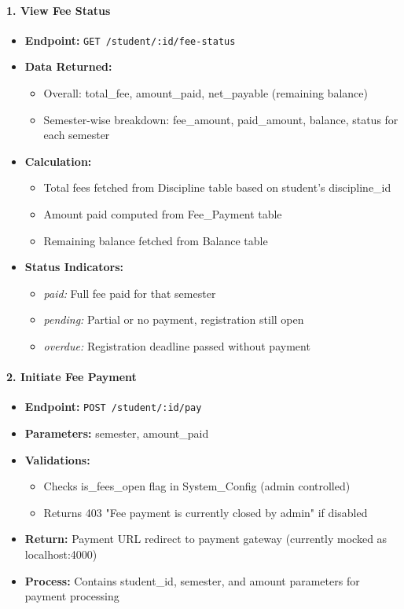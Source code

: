 \documentclass[12pt]{article}
\begin{document}
\paragraph{1. View Fee Status}
\begin{itemize}
    \item \textbf{Endpoint:} \texttt{GET /student/:id/fee-status}
    \item \textbf{Data Returned:}
        \begin{itemize}
            \item Overall: total\_fee, amount\_paid, net\_payable (remaining balance)
            \item Semester-wise breakdown: fee\_amount, paid\_amount, balance, status for each semester
        \end{itemize}
    \item \textbf{Calculation:}
        \begin{itemize}
            \item Total fees fetched from Discipline table based on student's discipline\_id
            \item Amount paid computed from Fee\_Payment table
            \item Remaining balance fetched from Balance table
        \end{itemize}
    \item \textbf{Status Indicators:}
        \begin{itemize}
            \item \textit{paid:} Full fee paid for that semester
            \item \textit{pending:} Partial or no payment, registration still open
            \item \textit{overdue:} Registration deadline passed without payment
        \end{itemize}
\end{itemize}

\paragraph{2. Initiate Fee Payment}
\begin{itemize}
    \item \textbf{Endpoint:} \texttt{POST /student/:id/pay}
    \item \textbf{Parameters:} semester, amount\_paid
    \item \textbf{Validations:}
        \begin{itemize}
            \item Checks is\_fees\_open flag in System\_Config (admin controlled)
            \item Returns 403 "Fee payment is currently closed by admin" if disabled
        \end{itemize}
    \item \textbf{Return:} Payment URL redirect to payment gateway (currently mocked as localhost:4000)
    \item \textbf{Process:} Contains student\_id, semester, and amount parameters for payment processing
\end{itemize}
\end{document}

